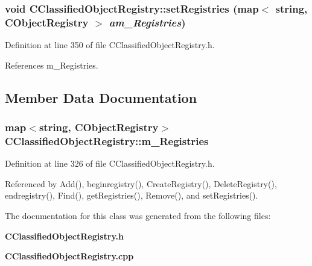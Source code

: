 \subsubsection{\setlength{\rightskip}{0pt plus 5cm}void CClassified\-Object\-Registry::set\-Registries (map$<$ string, {\bf CObject\-Registry} $>$ {\em am\_\-Registries})\hspace{0.3cm}{\tt  [inline, protected]}}\label{classCClassifiedObjectRegistry_b0}




Definition at line 350 of file CClassified\-Object\-Registry.h.

References m\_\-Registries.

\subsection{Member Data Documentation}
\subsubsection{\setlength{\rightskip}{0pt plus 5cm}map$<$string, {\bf CObject\-Registry}$>$ CClassified\-Object\-Registry::m\_\-Registries\hspace{0.3cm}{\tt  [private]}}\label{classCClassifiedObjectRegistry_o0}




Definition at line 326 of file CClassified\-Object\-Registry.h.

Referenced by Add(), beginregistry(), Create\-Registry(), Delete\-Registry(), endregistry(), Find(), get\-Registries(), Remove(), and set\-Registries().

The documentation for this class was generated from the following files:\begin{CompactItemize}
\item 
{\bf CClassified\-Object\-Registry.h}\item 
{\bf CClassified\-Object\-Registry.cpp}\end{CompactItemize}

